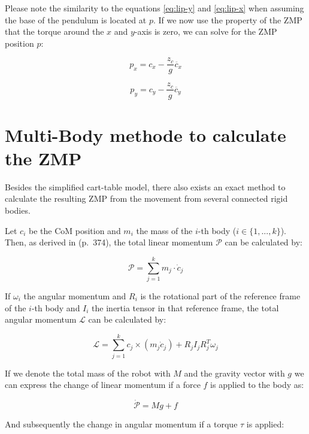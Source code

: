 \documentclass[english,ngerman]{KITreprt}
\begin{document}
Please note the similarity to the equations \ref{eq:lip-y} and
\ref{eq:lip-x} when assuming the base of the pendulum is located at $p$.
If we now use the property of the ZMP that the torque around the $x$ and
$y$-axis is zero, we can solve for the ZMP position $p$:

\begin{equation} \label{eq:zmp-x}
p_x = c_x - \frac{z_c}{g} \ddot{c_x}
\end{equation}

\begin{equation} \label{eq:zmp-y}
p_y = c_y - \frac{z_c}{g} \ddot{c_y}
\end{equation}

\section{Multi-Body methode to calculate the
ZMP}\label{section:multi-body-zmp}

Besides the simplified cart-table model, there also exists an exact
method to calculate the resulting ZMP from the movement from several
connected rigid bodies.

Let $c_i$ be the CoM position and $m_i$ the mass of the $i$-th body
($i \in \{1, ..., k\}$). Then, as derived in
\cite{siciliano2008springer} (p.~374), the total linear momentum
$\mathcal{P}$ can be calculated by:

\begin{equation}
\mathcal{P} = \sum^k_{j=1} m_j \cdot \dot{c}_j
\end{equation}

If $\omega_i$ the angular momentum and $R_i$ is the rotational part of
the reference frame of the $i$-th body and $I_i$ the inertia tensor in
that reference frame, the total angular momentum $\mathcal{L}$ can be
calculated by:

\begin{equation}
\mathcal{L} = \sum^k_{j=1} c_j \times (m_j \dot{c}_j) + R_j I_j R^T_j \omega_j
\end{equation}

If we denote the total mass of the robot with $M$ and the gravity vector
with $g$ we can express the change of linear momentum if a force $f$ is
applied to the body as:

\begin{equation} \label{eq:change-lin-momentum}
\dot{\mathcal{P}} = M g + f
\end{equation}

And subsequently the change in angular momentum if a torque $\tau$ is
applied:
\end{document}
